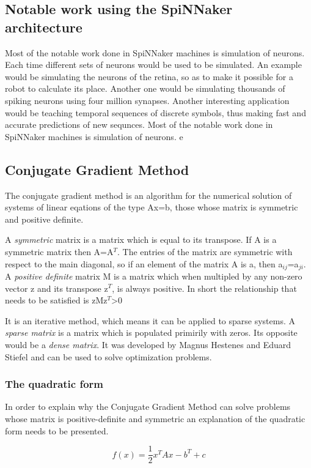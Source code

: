\documentclass[12pt,a4paper]{article}
\begin{document}
\subsection{Notable work using the SpiNNaker architecture}
Most of the notable work done in SpiNNaker machines is simulation of neurons. Each time different sets of neurons would be used to be simulated. An example would be simulating the neurons of the retina, so as to make it possible for a robot to calculate its place\cite{davies2010interfacing}. Another one would be simulating thousands of spiking neurons using four million synapses\cite{sharp2012power}. Another interesting application would be teaching temporal sequences  of discrete symbols, thus making fast and accurate predictions of new sequnces\cite{bose2005spiking}.
Most of the notable work done in SpiNNaker machines is simulation of neurons. e
\subsection{Conjugate Gradient Method}
The conjugate gradient method is an algorithm for the numerical solution of systems of linear eqations of the type Ax=b, those whose matrix is symmetric and positive definite. 

A \emph{symmetric} matrix is a matrix which is equal to its transpose. If A is a symmetric matrix then A=A$^T$. The entries of the matrix are symmetric with respect to the main diagonal, so if an element of the matrix A is a, then a$_{ij}$=a$_{ji}$. 
A \emph{positive definite} matrix M is a matrix which when multipled by any non-zero vector z and its transpose z$^T$, is always positive. In short the relationship that needs to be satisfied is zMz$^T$>0

It is an iterative method, which means it can be applied to sparse systems. A \emph{sparse matrix} is a matrix which is populated primirily with zeros. Its opposite would be a \emph{dense matrix}. It was developed by Magnus Hestenes and Eduard Stiefel and can be used to solve optimization problems\cite{press2007numerical}.
\subsubsection{The quadratic form}
In order to explain why the Conjugate Gradient Method can solve problems whose matrix is positive-definite and symmetric an explanation of the quadratic form needs to be presented.
\begin{center}
\begin{equation}
f(x)=\frac{1}{2}x^TAx-b^T+c
\end{equation}
\end{center}
\end{document}
